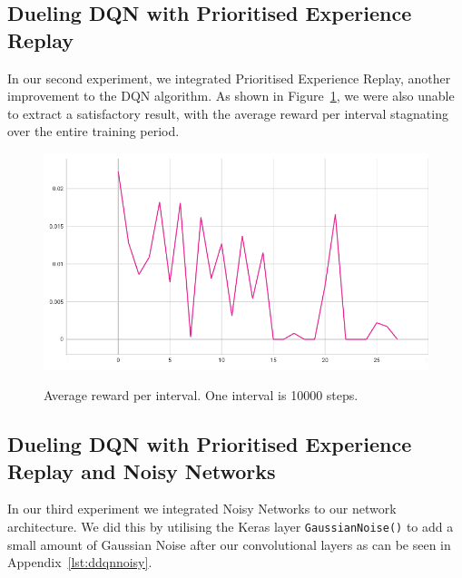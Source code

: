 \documentclass[12pt,a4paper]{article}
\begin{document}
    \subsection{Dueling DQN with Prioritised Experience Replay}\label{subsec:dueling-dqn-with-prioritised-experience-replay}
    In our second experiment, we integrated Prioritised Experience Replay, another improvement to the DQN algorithm.
    As shown in Figure~\ref{fig:ddqn_per_interval_score}, we were also unable to extract a satisfactory result, with the average reward per interval stagnating over the entire training period.

    \begin{figure}[H]
        \caption[DDQN/PER: Average reward per interval.]{Average reward per interval. One interval is 10000 steps.}
        \centering
        \includegraphics[scale=0.5]{interval_score_ddqn_per}
        \label{fig:ddqn_per_interval_score}
    \end{figure}

    \subsection{Dueling DQN with Prioritised Experience Replay and Noisy Networks}\label{subsec:dueling-dqn-with-prioritised-experience-replay-and-noisy-networks} %
    In our third experiment we integrated Noisy Networks to our network architecture.
    We did this by utilising the Keras layer \texttt{GaussianNoise()} to add a small amount of Gaussian Noise after our convolutional layers as can be seen in Appendix~\ref{lst:ddqnnoisy}.
\end{document}
